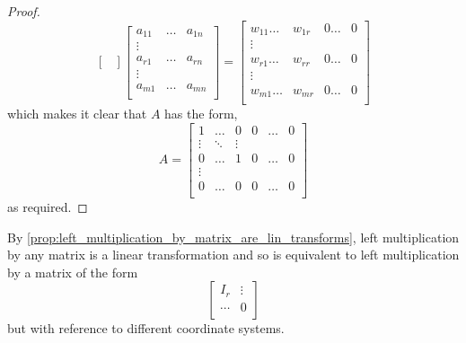 \documentclass[MathsNotesBase.tex]{subfiles}
\begin{document}
{\begin{proof}
\[\begin{bmatrix}
				\end{bmatrix}
				\begin{bmatrix}
				a_{11} & \dots & a_{1n} \\
				\vdots &  &  \\
				a_{r1} & \dots & a_{rn} \\
				\vdots &  &  \\
				a_{m1} & \dots & a_{mn} \\
				\end{bmatrix}
				= 
				\begin{bmatrix}
				w_{11} \dots & w_{1r} & 0 \dots & 0 \\
				\vdots &  &  &  \\
				w_{r1} \dots & w_{rr} & 0 \dots & 0 \\
				\vdots &  &  &  \\
				w_{m1} \dots & w_{mr} & 0 \dots & 0 \\
				\end{bmatrix}
			\]
			which makes it clear that $A$ has the form,
			\[ A =
				\begin{bmatrix}
				1 & \dots & 0 & 0 & \dots & 0 \\
				\vdots & \ddots & \vdots & &  \\
				0 & \dots & 1 & 0 & \dots & 0 \\
				\vdots &  & & &  \\
				0 & \dots & 0 & 0 & \dots & 0 \\
				\end{bmatrix}
			\]
			as required.
		\end{proof}
		\begin{corollary}
			By \autoref{prop:left_multiplication_by_matrix_are_lin_transforms}, left multiplication by any matrix is a linear transformation and so is equivalent to left multiplication by a matrix of the form
			\[
			\begin{bmatrix}
				I_r & \vdots \\
				\cdots & 0 \\
				\end{bmatrix}
			\]
			but with reference to different coordinate systems.
		\end{corollary}
	
		\bigskip
}
\end{document}
